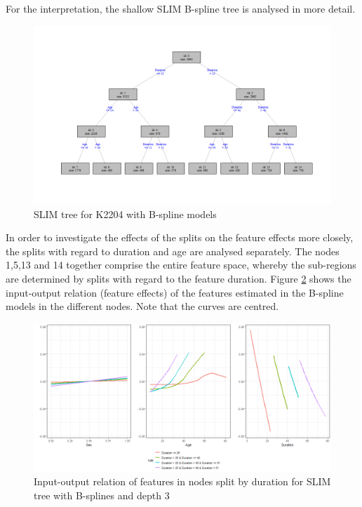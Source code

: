 For the interpretation, the shallow SLIM B-spline tree is analysed in more detail.

\begin{figure}[!htb]
    \centering   
    \includegraphics[width = 16cm]{Figures/insurance_use_case/k2204_BPV/slim_bsplines_small_tree.png}
         \caption{SLIM tree for K2204 with B-spline models}
     \label{fig:ins_slim_bsplines_tree}
\end{figure}

In order to investigate the effects of the splits on the feature effects more closely, the splits with regard to duration and age are analysed separately.
The nodes 1,5,13 and 14 together comprise the entire feature space, whereby the sub-regions are determined by splits with regard to the feature duration.
Figure \ref{fig:ins_k2204_effects_duration} shows the input-output relation (feature effects) of the features estimated in the B-spline models in the different nodes. Note that the curves are centred.

\begin{figure}[!htb]
    \centering
    \includegraphics[width = 16cm]{Figures/insurance_use_case/k2204_BPV/effects_duration.png}
    \caption{Input-output relation of features in nodes split by duration for SLIM tree with B-splines and depth 3}
    \label{fig:ins_k2204_effects_duration}
\end{figure}

